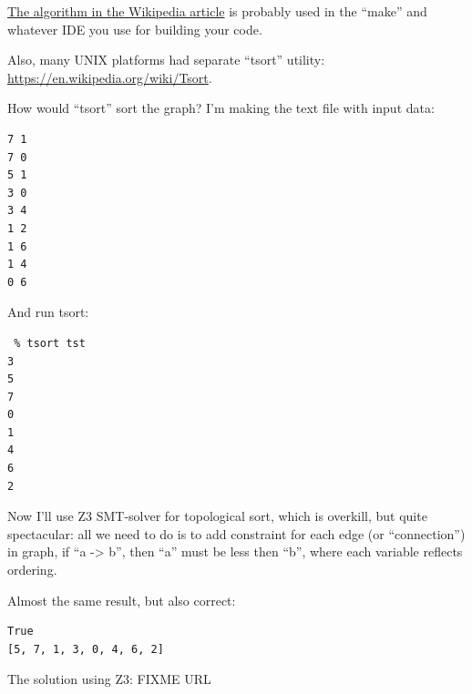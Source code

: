 \href{https://en.wikipedia.org/wiki/Topological_sorting}{The algorithm in the Wikipedia article}
is probably used in the ``make'' and whatever IDE you use for building your code.

Also, many UNIX platforms had separate ``tsort'' utility:
\url{https://en.wikipedia.org/wiki/Tsort}.

How would ``tsort'' sort the graph? I'm making the text file with input data:

\begin{lstlisting}
7 1
7 0
5 1
3 0
3 4
1 2
1 6
1 4
0 6
\end{lstlisting}

And run tsort:

\begin{lstlisting}
 % tsort tst
3
5
7
0
1
4
6
2
\end{lstlisting}

Now I'll use Z3 SMT-solver for topological sort, which is overkill, but quite spectacular: all we need to do
is to add constraint for each edge (or ``connection'') in graph, if ``a -> b'', then ``a'' must be less then ``b'', where
each variable reflects ordering.



Almost the same result, but also correct:

\begin{lstlisting}
True
[5, 7, 1, 3, 0, 4, 6, 2]
\end{lstlisting}

The solution using Z3: FIXME URL

